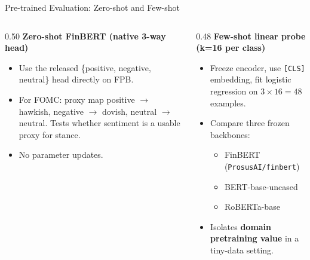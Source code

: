 \documentclass[10pt, aspectratio=169]{beamer}
\begin{document}
\begin{frame}{Pre-trained Evaluation: Zero-shot and Few-shot}
    \begin{columns}[T]
        \begin{column}{0.50\textwidth}
            \textbf{Zero-shot FinBERT (native 3-way head)}~\cite{araci2019finbert,yang2020finbert}
            \begin{itemize}\setlength{\itemsep}{1pt}
                \item Use the released \{positive, negative, neutral\} head directly on FPB.
                \item For FOMC: \alert{proxy map} positive $\rightarrow$ hawkish, negative $\rightarrow$ dovish, neutral $\rightarrow$ neutral. Tests whether sentiment is a usable proxy for stance.
                \item No parameter updates.
            \end{itemize}
        \end{column}
        \begin{column}{0.48\textwidth}
            \textbf{Few-shot linear probe (k=16 per class)}
            \begin{itemize}\setlength{\itemsep}{1pt}
                \item Freeze encoder, use \texttt{[CLS]} embedding, fit logistic regression on $3\times 16 = 48$ examples.
                \item Compare three frozen backbones:
                \begin{itemize}
                    \item FinBERT (\texttt{ProsusAI/finbert})
                    \item BERT-base-uncased~\cite{devlin2019bert}
                    \item RoBERTa-base
                \end{itemize}
                \item Isolates \textbf{domain pretraining value} in a tiny-data setting.
            \end{itemize}
        \end{column}
    \end{columns}
\end{frame}
\end{document}
